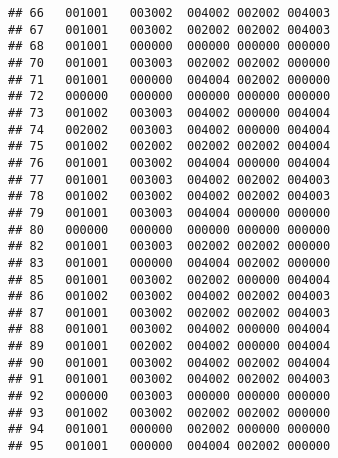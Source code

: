 \documentclass[
]{article}
\begin{document}
\begin{verbatim}
## 66   001001   003002  004002 002002 004003
## 67   001001   003002  002002 002002 004003
## 68   001001   000000  000000 000000 000000
## 70   001001   003003  002002 002002 000000
## 71   001001   000000  004004 002002 000000
## 72   000000   000000  000000 000000 000000
## 73   001002   003003  004002 000000 004004
## 74   002002   003003  004002 000000 004004
## 75   001002   002002  002002 002002 004004
## 76   001001   003002  004004 000000 004004
## 77   001001   003003  004002 002002 004003
## 78   001002   003002  004002 002002 004003
## 79   001001   003003  004004 000000 000000
## 80   000000   000000  000000 000000 000000
## 82   001001   003003  002002 002002 000000
## 83   001001   000000  004004 002002 000000
## 85   001001   003002  002002 000000 004004
## 86   001002   003002  004002 002002 004003
## 87   001001   003002  002002 002002 004003
## 88   001001   003002  004002 000000 004004
## 89   001001   002002  004002 000000 004004
## 90   001001   003002  004002 002002 004004
## 91   001001   003002  004002 002002 004003
## 92   000000   003003  000000 000000 000000
## 93   001002   003002  002002 002002 000000
## 94   001001   000000  002002 000000 000000
## 95   001001   000000  004004 002002 000000
\end{verbatim}
\end{document}
